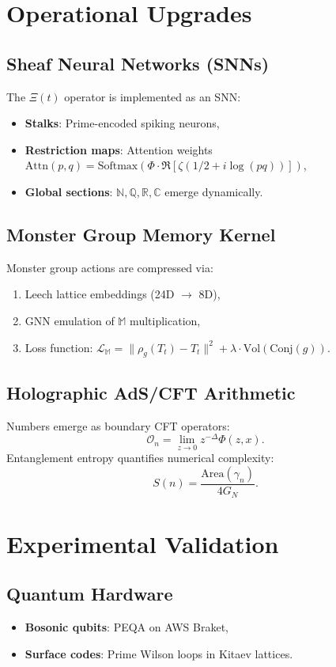 \documentclass{article}
\theoremstyle{plain}
\begin{document}
\section{Operational Upgrades}

\subsection{Sheaf Neural Networks (SNNs)}
The $\Xi(t)$ operator is implemented as an SNN:
\begin{itemize}
    \item \textbf{Stalks}: Prime-encoded spiking neurons,
    \item \textbf{Restriction maps}: Attention weights $\text{Attn}(p, q) = \text{Softmax}(\Phi \cdot \Re[\zeta(1/2 + i \log(pq))])$,
    \item \textbf{Global sections}: $\mathbb{N}, \mathbb{Q}, \mathbb{R}, \mathbb{C}$ emerge dynamically.
\end{itemize}

\subsection{Monster Group Memory Kernel}
Monster group actions are compressed via:
\begin{enumerate}
    \item Leech lattice embeddings (24D $\to$ 8D),
    \item GNN emulation of $\mathbb{M}$ multiplication,
    \item Loss function: $\mathcal{L}_\mathbb{M} = \|\rho_g(T_t) - T_t\|^2 + \lambda \cdot \text{Vol}(\text{Conj}(g))$.
\end{enumerate}

\subsection{Holographic AdS/CFT Arithmetic}
Numbers emerge as boundary CFT operators:
\[
\mathcal{O}_n = \lim_{z \to 0} z^{-\Delta} \Phi(z, x).
\]
Entanglement entropy quantifies numerical complexity:
\[
S(n) = \frac{\text{Area}(\gamma_n)}{4 G_N}.
\]

\section{Experimental Validation}

\subsection{Quantum Hardware}
\begin{itemize}
    \item \textbf{Bosonic qubits}: PEQA on AWS Braket,
    \item \textbf{Surface codes}: Prime Wilson loops in Kitaev lattices.
\end{itemize}
\end{document}
